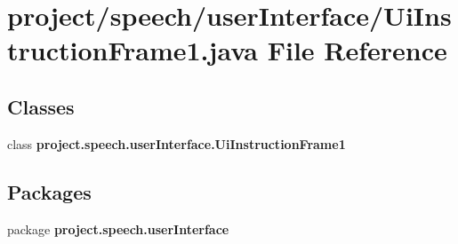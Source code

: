 \section{project/speech/user\+Interface/\+Ui\+Instruction\+Frame1.java File Reference}
\label{_ui_instruction_frame1_8java}
\subsection*{Classes}
\begin{DoxyCompactItemize}
\item 
class {\bf project.\+speech.\+user\+Interface.\+Ui\+Instruction\+Frame1}
\end{DoxyCompactItemize}
\subsection*{Packages}
\begin{DoxyCompactItemize}
\item 
package {\bf project.\+speech.\+user\+Interface}
\end{DoxyCompactItemize}
